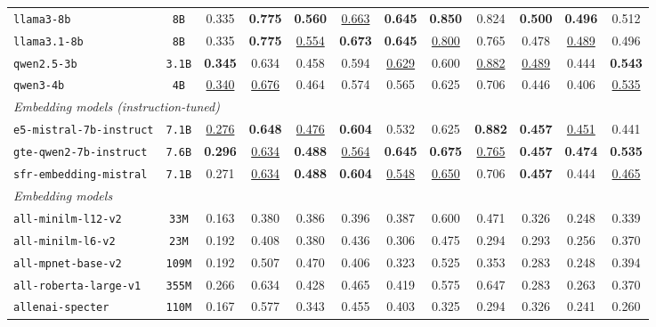 \documentclass{article}
\begin{document}
\begin{table}[htbp]
{\begin{tabular}{lccccccccccc}
\texttt{llama3-8b} & \texttt{8B} & 0.335 & \textbf{0.775} & \textbf{0.560} & \underline{0.663} & \textbf{0.645} & \textbf{0.850} & 0.824 & \textbf{0.500} & \textbf{0.496} & 0.512 \\
\texttt{llama3.1-8b} & \texttt{8B} & 0.335 & \textbf{0.775} & \underline{0.554} & \textbf{0.673} & \textbf{0.645} & \underline{0.800} & 0.765 & 0.478 & \underline{0.489} & 0.496 \\
\texttt{qwen2.5-3b} & \texttt{3.1B} & \textbf{0.345} & 0.634 & 0.458 & 0.594 & \underline{0.629} & 0.600 & \underline{0.882} & \underline{0.489} & 0.444 & \textbf{0.543} \\
\texttt{qwen3-4b} & \texttt{4B} & \underline{0.340} & \underline{0.676} & 0.464 & 0.574 & 0.565 & 0.625 & 0.706 & 0.446 & 0.406 & \underline{0.535} \\
\midrule
\multicolumn{12}{l}{\textit{Embedding models (instruction-tuned)}} \\
\midrule
\texttt{e5-mistral-7b-instruct} & \texttt{7.1B} & \underline{0.276} & \textbf{0.648} & \underline{0.476} & \textbf{0.604} & 0.532 & 0.625 & \textbf{0.882} & \textbf{0.457} & \underline{0.451} & 0.441 \\
\texttt{gte-qwen2-7b-instruct} & \texttt{7.6B} & \textbf{0.296} & \underline{0.634} & \textbf{0.488} & \underline{0.564} & \textbf{0.645} & \textbf{0.675} & \underline{0.765} & \textbf{0.457} & \textbf{0.474} & \textbf{0.535} \\
\texttt{sfr-embedding-mistral} & \texttt{7.1B} & 0.271 & \underline{0.634} & \textbf{0.488} & \textbf{0.604} & \underline{0.548} & \underline{0.650} & 0.706 & \textbf{0.457} & 0.444 & \underline{0.465} \\
\midrule
\multicolumn{12}{l}{\textit{Embedding models}} \\
\midrule
\texttt{all-minilm-l12-v2} & \texttt{33M} & 0.163 & 0.380 & 0.386 & 0.396 & 0.387 & 0.600 & 0.471 & 0.326 & 0.248 & 0.339 \\
\texttt{all-minilm-l6-v2} & \texttt{23M} & 0.192 & 0.408 & 0.380 & 0.436 & 0.306 & 0.475 & 0.294 & 0.293 & 0.256 & 0.370 \\
\texttt{all-mpnet-base-v2} & \texttt{109M} & 0.192 & 0.507 & 0.470 & 0.406 & 0.323 & 0.525 & 0.353 & 0.283 & 0.248 & 0.394 \\
\texttt{all-roberta-large-v1} & \texttt{355M} & 0.266 & 0.634 & 0.428 & 0.465 & 0.419 & 0.575 & 0.647 & 0.283 & 0.263 & 0.370 \\
\texttt{allenai-specter} & \texttt{110M} & 0.167 & 0.577 & 0.343 & 0.455 & 0.403 & 0.325 & 0.294 & 0.326 & 0.241 & 0.260 \\

\end{tabular}}
\end{table}
\end{document}
